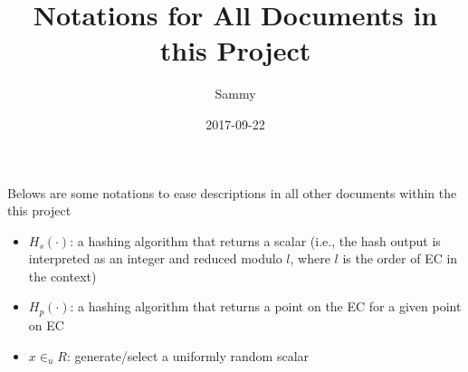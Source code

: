 \documentclass[a4paper,10pt]{article}
\title{Notations for All Documents in this Project}
\author{Sammy}
\date{2017-09-22}
\begin{document}
\maketitle

Belows are some notations to ease descriptions in all other documents within the this project
	\begin{itemize}
		\item \(H_s(\cdot)\): a hashing algorithm that returns a scalar (i.e., the hash output is interpreted as an integer and reduced modulo \(l\), where \(l\) is the order of EC in the context)
		\item \(H_p(\cdot)\): a hashing algorithm that returns a point on the EC for a given point on EC
		\item \(x\in_u R\): generate/select a uniformly random scalar
	\end{itemize}
\end{document}
